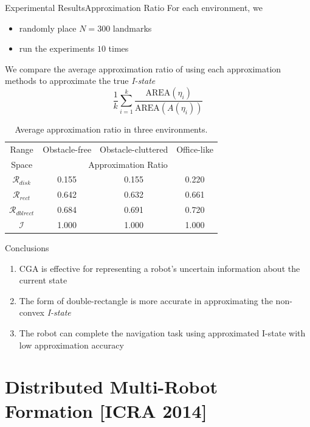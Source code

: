 \documentclass[10pt]{beamer}
\begin{document}
\begin{frame}{Experimental Results}{Approximation Ratio}
  For each environment, we
  \begin{itemize}
  \item randomly place $N = 300$ landmarks 
  \item run the  experiments $10$ times
  \end{itemize} 
  \begin{block}{}
    We compare the average approximation ratio of using each approximation methods
    to approximate  the true \emph{I-state}
    $$\frac{1}{k} \sum_{i=1}^k \frac{\text{AREA}(\eta_i)}{\text{AREA}(A(\eta_i))}$$
  \end{block}
\begin{table}
  \footnotesize\centering
    \begin{tabular}{cccc} 
    \hline
    Range & Obstacle-free & Obstacle-cluttered & Office-like\\
    Space & \multicolumn{3}{c}{Approximation  Ratio}  \\
    \hline
      $\mathcal{R}_{disk}$ & 0.155  & 0.155   & 0.220 \\ 
    \hline
    $\mathcal{R}_{rect}$  & 0.642   & 0.632  & 0.661 \\
    \hline
    $\mathcal{R}_{dblrect}$ & 0.684 & 0.691  & 0.720 \\
    \hline
    $\mathcal{I}$ & 1.000  & 1.000  & 1.000 \\
    \hline
    \end{tabular}
    \caption{{Average approximation ratio in three environments.}}
\end{table}

\end{frame}

\begin{frame}{Conclusions}
  \begin{enumerate}
  \item CGA is effective for representing a robot's uncertain information about
    the current state
  \item The form of double-rectangle is more accurate in approximating the non-convex
    \emph{I-state}
  \item The robot can complete the navigation task using approximated I-state with
    low approximation accuracy
  \end{enumerate}
\end{frame}

\section{Distributed Multi-Robot Formation [ICRA 2014]}
\end{document}
